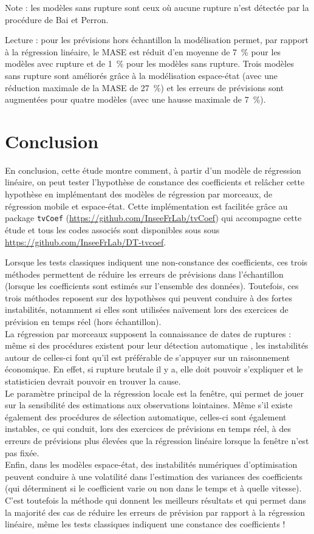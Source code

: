\documentclass[
  a4paper,
  DIV=11,
  numbers=noendperiod,
  french]{scrartcl}
\newcommand\1{{\mathds 1}}
\theoremstyle{remark}
\begin{document}
Note : les modèles sans rupture sont ceux où aucune rupture n'est
détectée par la procédure de Bai et Perron.

Lecture : pour les prévisions hors échantillon la modélisation permet,
par rapport à la régression linéaire, le MASE est réduit d'en moyenne de
7~\% pour les modèles avec rupture et de 1~\% pour les modèles sans
rupture. Trois modèles sans rupture sont améliorés grâce à la
modélisation espace-état (avec une réduction maximale de la MASE de
27~\%) et les erreurs de prévisions sont augmentées pour quatre modèles
(avec une hausse maximale de 7~\%).

\section{Conclusion}\label{conclusion}

En conclusion, cette étude montre comment, à partir d'un modèle de
régression linéaire, on peut tester l'hypothèse de constance des
coefficients et relâcher cette hypothèse en implémentant des modèles de
régression par morceaux, de régression mobile et espace-état. Cette
implémentation est facilitée grâce au package \texttt{tvCoef}
(\url{https://github.com/InseeFrLab/tvCoef}) qui accompagne cette étude
et tous les codes associés sont disponibles sous sous
\url{https://github.com/InseeFrLab/DT-tvcoef}.

Lorsque les tests classiques indiquent une non-constance des
coefficients, ces trois méthodes permettent de réduire les erreurs de
prévisions dans l'échantillon (lorsque les coefficients sont estimés sur
l'ensemble des données). Toutefois, ces trois méthodes reposent sur des
hypothèses qui peuvent conduire à des fortes instabilités, notamment si
elles sont utilisées naïvement lors des exercices de prévision en temps
réel (hors échantillon).\\
La régression par morceaux supposent la connaissance de dates de
ruptures : même si des procédures existent pour leur détection
automatique \autocite{bai2003computation}, les instabilités autour de
celles-ci font qu'il est préférable de s'appuyer sur un raisonnement
économique. En effet, si rupture brutale il y a, elle doit pouvoir
s'expliquer et le statisticien devrait pouvoir en trouver la cause.\\
Le paramètre principal de la régression locale est la fenêtre, qui
permet de jouer sur la sensibilité des estimations aux observations
lointaines. Même s'il existe également des procédures de sélection
automatique, celles-ci sont également instables, ce qui conduit, lors
des exercices de prévisions en temps réel, à des erreurs de prévisions
plus élevées que la régression linéaire lorsque la fenêtre n'est pas
fixée.\\
Enfin, dans les modèles espace-état, des instabilités numériques
d'optimisation peuvent conduire à une volatilité dans l'estimation des
variances des coefficients (qui déterminent si le coefficient varie ou
non dans le temps et à quelle vitesse). C'est toutefois la méthode qui
donnent les meilleurs résultats et qui permet dans la majorité des cas
de réduire les erreurs de prévision par rapport à la régression
linéaire, même les tests classiques indiquent une constance des
coefficients !
\end{document}
